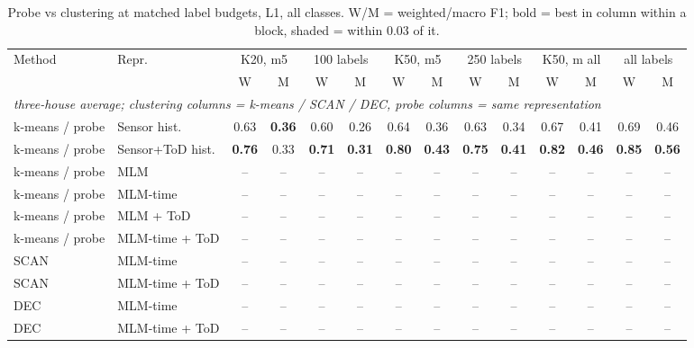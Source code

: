 \begin{table}[H]
\centering\small
\caption{Probe vs clustering at matched label budgets, L1, all classes. W/M = weighted/macro F1; bold = best in column within a block, shaded = within 0.03 of it.}
\label{tab:cmp_l1_all}
\setlength{\tabcolsep}{3.5pt}
\begin{tabular}{llcc|cc|cc|cc|cc|cc}
\toprule
Method & Repr. & \multicolumn{2}{c}{K20, m5} & \multicolumn{2}{c}{100 labels} & \multicolumn{2}{c}{K50, m5} & \multicolumn{2}{c}{250 labels} & \multicolumn{2}{c}{K50, m all} & \multicolumn{2}{c}{all labels} \\
\cmidrule(lr){3-4}\cmidrule(lr){5-6}\cmidrule(lr){7-8}\cmidrule(lr){9-10}\cmidrule(lr){11-12}\cmidrule(lr){13-14}
 & & W & M & W & M & W & M & W & M & W & M & W & M \\
\midrule
\multicolumn{14}{l}{\textit{three-house average; clustering columns = k-means / SCAN / DEC, probe columns = same representation}} \\
\midrule
k-means / probe & Sensor hist. & 0.63 & \cellcolor{blue!12}\textbf{0.36} & 0.60 & 0.26 & 0.64 & 0.36 & 0.63 & 0.34 & 0.67 & 0.41 & 0.69 & 0.46 \\
k-means / probe & Sensor+ToD hist. & \cellcolor{blue!12}\textbf{0.76} & \cellcolor{blue!12}0.33 & \cellcolor{blue!12}\textbf{0.71} & \cellcolor{blue!12}\textbf{0.31} & \cellcolor{blue!12}\textbf{0.80} & \cellcolor{blue!12}\textbf{0.43} & \cellcolor{blue!12}\textbf{0.75} & \cellcolor{blue!12}\textbf{0.41} & \cellcolor{blue!12}\textbf{0.82} & \cellcolor{blue!12}\textbf{0.46} & \cellcolor{blue!12}\textbf{0.85} & \cellcolor{blue!12}\textbf{0.56} \\
\cmidrule{1-14}
k-means / probe & MLM & -- & -- & -- & -- & -- & -- & -- & -- & -- & -- & -- & -- \\
k-means / probe & MLM-time & -- & -- & -- & -- & -- & -- & -- & -- & -- & -- & -- & -- \\
k-means / probe & MLM + ToD & -- & -- & -- & -- & -- & -- & -- & -- & -- & -- & -- & -- \\
k-means / probe & MLM-time + ToD & -- & -- & -- & -- & -- & -- & -- & -- & -- & -- & -- & -- \\
\cmidrule{1-14}
SCAN & MLM-time & -- & -- & -- & -- & -- & -- & -- & -- & -- & -- & -- & -- \\
SCAN & MLM-time + ToD & -- & -- & -- & -- & -- & -- & -- & -- & -- & -- & -- & -- \\
\cmidrule{1-14}
DEC & MLM-time & -- & -- & -- & -- & -- & -- & -- & -- & -- & -- & -- & -- \\
DEC & MLM-time + ToD & -- & -- & -- & -- & -- & -- & -- & -- & -- & -- & -- & -- \\
\bottomrule
\end{tabular}
\end{table}

